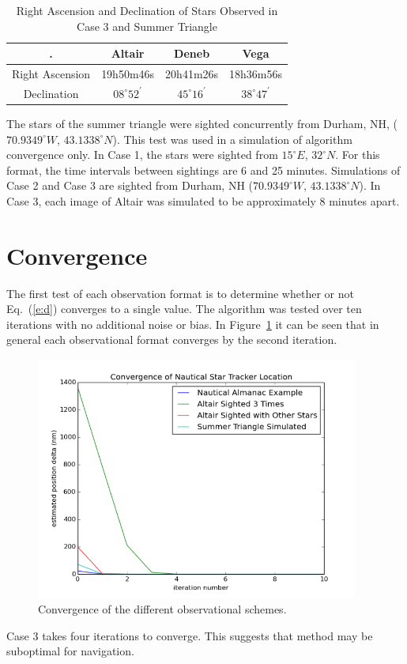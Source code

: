 \documentclass[12pt,a4paper]{book}
\begin{document}
\begin{table}[ht!]
\centering
\begin{tabular}{ |c|c|c|c| } 
 \hline
 . & Altair & Deneb & Vega\\ 
 \hline
 Right Ascension & 19h50m46s & 20h41m26s & 18h36m56s \\ 
 \hline
 Declination & $08^{\circ}52^{'}$ & $45^{\circ}16^{'}$ & $38^{\circ}47^{'}$ \\ 
 \hline
\end{tabular}
\caption{Right Ascension and Declination of Stars Observed in Case 3 and Summer Triangle}
\label{t:summerTri}
\end{table}
\FloatBarrier
The stars of the summer triangle were sighted concurrently from Durham, NH, ($70.9349^{\circ}W$, $43.1338^{\circ}N$). This test was used in a simulation of algorithm convergence only. In Case 1, the stars were sighted from $15^{\circ} E$, $32^{\circ} N$.  For this format, the time intervals between sightings are 6 and 25 minutes. Simulations of Case 2 and Case 3 are sighted from Durham, NH ($70.9349^{\circ}W$, $43.1338^{\circ}N$).  In Case 3, each image of Altair was simulated to be approximately 8 minutes apart.

\section{Convergence}
The first test of each observation format is to determine whether or not Eq.~(\ref{e:d}) converges to a single value.  The algorithm was tested over ten iterations with no additional noise or bias. In Figure~\ref{f:converge} it can be seen that in general each observational format converges by the second iteration. 
\begin{figure}[!ht]%
\centering
\includegraphics[height=8cm]{convergence.png}
\caption{Convergence of the different observational schemes.}
\label{f:converge}
\end{figure}
Case 3 takes four iterations to converge.  This suggests that method may be suboptimal for navigation.
\end{document}
